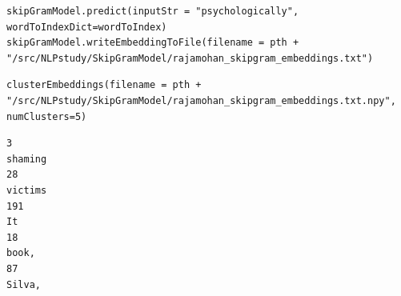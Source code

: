\documentclass[
]{article}
\begin{document}
\begin{verbatim}
skipGramModel.predict(inputStr = "psychologically", wordToIndexDict=wordToIndex)
skipGramModel.writeEmbeddingToFile(filename = pth + "/src/NLPstudy/SkipGramModel/rajamohan_skipgram_embeddings.txt")
\end{verbatim}

\begin{verbatim}
clusterEmbeddings(filename = pth + "/src/NLPstudy/SkipGramModel/rajamohan_skipgram_embeddings.txt.npy", numClusters=5)
\end{verbatim}

\begin{verbatim}
3
shaming
28
victims
191
It
18
book,
87
Silva,
\end{verbatim}

\begin{verbatim}
\end{verbatim}
\end{document}
